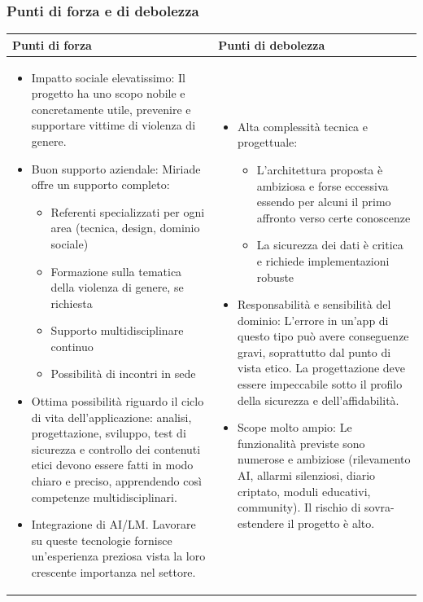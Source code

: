 \documentclass[a4paper,11pt]{article}
\begin{document}
\subsubsection{Punti di forza e di debolezza}
{\footnotesize
\begin{tabularx}{\textwidth}{|X|X|}
\hline
\rowcolor{lightgray!40} %
\textbf{Punti di forza} & \textbf{Punti di debolezza} \\
\hline
\begin{itemize}
\item Impatto sociale elevatissimo: Il progetto ha uno scopo nobile e concretamente utile, prevenire e supportare vittime di violenza di genere.
\item Buon supporto aziendale: Miriade offre un supporto completo:
\begin{itemize}
  \item Referenti specializzati per ogni area (tecnica, design, dominio sociale)
  \item Formazione sulla tematica della violenza di genere, se richiesta
  \item Supporto multidisciplinare continuo
  \item Possibilità di incontri in sede
\end{itemize}
\item Ottima possibilità riguardo il ciclo di vita dell'applicazione: analisi, progettazione, sviluppo, test di sicurezza e controllo dei contenuti etici devono essere fatti in modo chiaro e preciso, apprendendo così competenze multidisciplinari.
\item Integrazione di AI/LM. Lavorare su queste tecnologie fornisce un'esperienza preziosa vista la loro crescente importanza nel settore.
\end{itemize}
 & \begin{itemize}
\item Alta complessità tecnica e progettuale:
\begin{itemize}
  \item L'architettura proposta è ambiziosa e forse eccessiva essendo per alcuni il primo affronto verso certe conoscenze
  \item La sicurezza dei dati è critica e richiede implementazioni robuste
\end{itemize}
\item 	Responsabilità e sensibilità del dominio: L'errore in un'app di questo tipo può avere conseguenze gravi, soprattutto dal punto di vista etico. La progettazione deve essere impeccabile sotto il profilo della sicurezza e dell'affidabilità.
\item Scope molto ampio: Le funzionalità previste sono numerose e ambiziose (rilevamento AI, allarmi silenziosi, diario criptato, moduli educativi, community). Il rischio di sovra-estendere il progetto è alto.
\end{itemize} \\
\hline
\end{tabularx}
}
\end{document}
